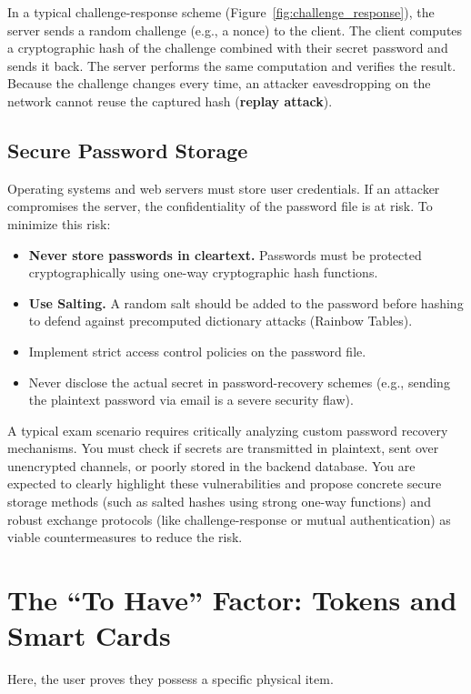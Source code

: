 In a typical challenge-response scheme (Figure~\ref{fig:challenge_response}), the server sends a random challenge (e.g., a nonce) to the client. The client computes a cryptographic hash of the challenge combined with their secret password and sends it back. The server performs the same computation and verifies the result. Because the challenge changes every time, an attacker eavesdropping on the network cannot reuse the captured hash (\textbf{replay attack}).

\subsection{Secure Password Storage}
Operating systems and web servers must store user credentials. If an attacker compromises the server, the confidentiality of the password file is at risk. 
To minimize this risk:
\begin{itemize}
    \item \textbf{Never store passwords in cleartext.} Passwords must be protected cryptographically using one-way cryptographic hash functions.
    \item \textbf{Use Salting.} A random salt should be added to the password before hashing to defend against precomputed dictionary attacks (Rainbow Tables).
    \item Implement strict access control policies on the password file.
    \item Never disclose the actual secret in password-recovery schemes (e.g., sending the plaintext password via email is a severe security flaw).
\end{itemize}

\begin{tcolorbox}[colback=blue!5!white,colframe=blue!75!black,title=Exam Insight]
A typical exam scenario requires critically analyzing custom password recovery mechanisms. You must check if secrets are transmitted in plaintext, sent over unencrypted channels, or poorly stored in the backend database. You are expected to clearly highlight these vulnerabilities and propose concrete secure storage methods (such as salted hashes using strong one-way functions) and robust exchange protocols (like challenge-response or mutual authentication) as viable countermeasures to reduce the risk.
\end{tcolorbox}

\section{The ``To Have'' Factor: Tokens and Smart Cards}
Here, the user proves they possess a specific physical item.


